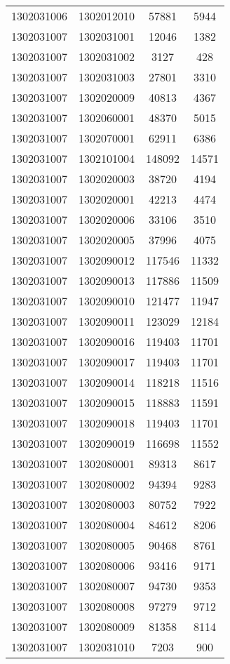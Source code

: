 \begin{longtable}[h]{llcc}
		1302031006 & 1302012010 & 57881 & 5944\\
		1302031007 & 1302031001 & 12046 & 1382\\
		1302031007 & 1302031002 & 3127 & 428\\
		1302031007 & 1302031003 & 27801 & 3310\\
		1302031007 & 1302020009 & 40813 & 4367\\
		1302031007 & 1302060001 & 48370 & 5015\\
		1302031007 & 1302070001 & 62911 & 6386\\
		1302031007 & 1302101004 & 148092 & 14571\\
		1302031007 & 1302020003 & 38720 & 4194\\
		1302031007 & 1302020001 & 42213 & 4474\\
		1302031007 & 1302020006 & 33106 & 3510\\
		1302031007 & 1302020005 & 37996 & 4075\\
		1302031007 & 1302090012 & 117546 & 11332\\
		1302031007 & 1302090013 & 117886 & 11509\\
		1302031007 & 1302090010 & 121477 & 11947\\
		1302031007 & 1302090011 & 123029 & 12184\\
		1302031007 & 1302090016 & 119403 & 11701\\
		1302031007 & 1302090017 & 119403 & 11701\\
		1302031007 & 1302090014 & 118218 & 11516\\
		1302031007 & 1302090015 & 118883 & 11591\\
		1302031007 & 1302090018 & 119403 & 11701\\
		1302031007 & 1302090019 & 116698 & 11552\\
		1302031007 & 1302080001 & 89313 & 8617\\
		1302031007 & 1302080002 & 94394 & 9283\\
		1302031007 & 1302080003 & 80752 & 7922\\
		1302031007 & 1302080004 & 84612 & 8206\\
		1302031007 & 1302080005 & 90468 & 8761\\
		1302031007 & 1302080006 & 93416 & 9171\\
		1302031007 & 1302080007 & 94730 & 9353\\
		1302031007 & 1302080008 & 97279 & 9712\\
		1302031007 & 1302080009 & 81358 & 8114\\
		1302031007 & 1302031010 & 7203 & 900\\

\end{longtable}
